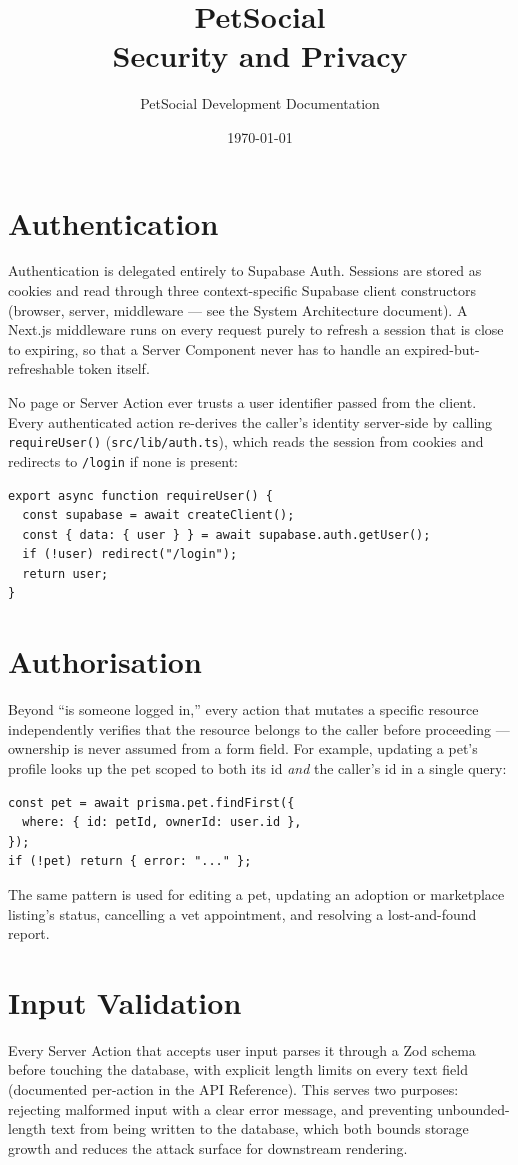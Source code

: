 \documentclass[11pt,a4paper]{article}
\title{PetSocial\\\large Security and Privacy}
\author{PetSocial Development Documentation}
\date{\today}
\begin{document}
\maketitle
\thispagestyle{fancy}
\tableofcontents

\section{Authentication}
Authentication is delegated entirely to Supabase Auth. Sessions are stored as
cookies and read through three context-specific Supabase client constructors (browser,
server, middleware --- see the System Architecture document). A Next.js middleware
runs on every request purely to refresh a session that is close to expiring, so that a
Server Component never has to handle an expired-but-refreshable token itself.

No page or Server Action ever trusts a user identifier passed from the client. Every
authenticated action re-derives the caller's identity server-side by calling
\texttt{requireUser()} (\texttt{src/lib/auth.ts}), which reads the session from cookies
and redirects to \texttt{/login} if none is present:
\begin{lstlisting}
export async function requireUser() {
  const supabase = await createClient();
  const { data: { user } } = await supabase.auth.getUser();
  if (!user) redirect("/login");
  return user;
}
\end{lstlisting}

\section{Authorisation}
Beyond ``is someone logged in,'' every action that mutates a specific resource
independently verifies that the resource belongs to the caller before proceeding ---
ownership is never assumed from a form field. For example, updating a pet's profile
looks up the pet scoped to both its id \emph{and} the caller's id in a single query:
\begin{lstlisting}
const pet = await prisma.pet.findFirst({
  where: { id: petId, ownerId: user.id },
});
if (!pet) return { error: "..." };
\end{lstlisting}
The same pattern is used for editing a pet, updating an adoption or marketplace
listing's status, cancelling a vet appointment, and resolving a lost-and-found report.

\section{Input Validation}
Every Server Action that accepts user input parses it through a Zod schema before
touching the database, with explicit length limits on every text field (documented
per-action in the API Reference). This serves two purposes: rejecting malformed input
with a clear error message, and preventing unbounded-length text from being written to
the database, which both bounds storage growth and reduces the attack surface for
downstream rendering.
\end{document}
